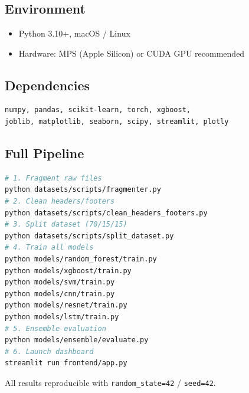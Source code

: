 \documentclass[12pt,a4paper]{report}
\begin{document}
\newpage
\chapter{}
\begin{normalsize}
\noindent

\section{Environment}
{\setlength{\baselineskip}{0.95\baselineskip}
\begin{itemize}[noitemsep]
    \item Python 3.10+, macOS / Linux
    \item Hardware: MPS (Apple Silicon) or CUDA GPU recommended
\end{itemize}
\par}

\section{Dependencies}
{\setlength{\baselineskip}{0.95\baselineskip}
\begin{lstlisting}
numpy, pandas, scikit-learn, torch, xgboost,
joblib, matplotlib, seaborn, scipy, streamlit, plotly
\end{lstlisting}
\par}

\section{Full Pipeline}
{\setlength{\baselineskip}{0.95\baselineskip}
\begin{lstlisting}[language=bash]
# 1. Fragment raw files
python datasets/scripts/fragmenter.py
# 2. Clean headers/footers
python datasets/scripts/clean_headers_footers.py
# 3. Split dataset (70/15/15)
python datasets/scripts/split_dataset.py
# 4. Train all models
python models/random_forest/train.py
python models/xgboost/train.py
python models/svm/train.py
python models/cnn/train.py
python models/resnet/train.py
python models/lstm/train.py
# 5. Ensemble evaluation
python models/ensemble/evaluate.py
# 6. Launch dashboard
streamlit run frontend/app.py
\end{lstlisting}

All results reproducible with \texttt{random\_state=42} / \texttt{seed=42}.
\par}

\end{normalsize}
\end{document}
